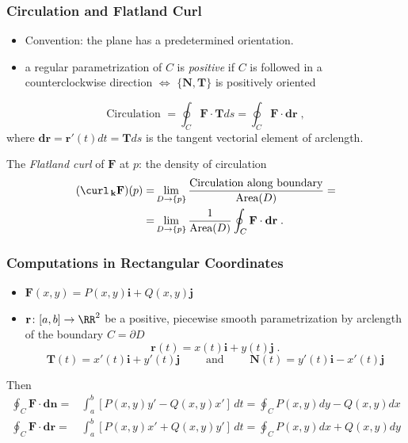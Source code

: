 \begin{frame}
  \frametitle{Circulation and Flatland Curl}

    \begin{itemize}
      \item Convention: the plane has a predetermined orientation.
      \item a regular parametrization of $C$ is \emph{positive} if $C$ is followed in a counterclockwise direction $\Longleftrightarrow$ $\{ \textbf{N}, \textbf{T}\}$ is positively oriented
    \end{itemize}

%
$$\text{Circulation } = \oint_C \textbf{F} \cdot \textbf{T} ds = \oint_C \textbf{F} \cdot \textbf{dr}\; ,$$
%
where $\textbf{dr} = \textbf{r}'(t) dt = \textbf{T} ds$ is the tangent vectorial element of arclength.

\medskip

\pause The \emph{Flatland curl} of $\textbf{F}$ at $p$:  the density of circulation
%
\begin{align*}
(\curl_{\,\textbf{k}} \textbf{F})(p)= & \lim_{D \to \{p\}} \frac{\text{Circulation along boundary}}{\text{Area}(D)} =  \\ = &
      \lim_{D\to \{p\}} \frac{1}{\text{Area}(D)} \oint_C \textbf{F} \cdot \textbf{dr} \; .
\end{align*}

\end{frame}

\begin{frame}
  \frametitle{Computations in Rectangular Coordinates}
\begin{itemize}
  \item $\textbf{F} (x,y) = P(x,y) \textbf{i} + Q(x,y) \textbf{j}$
  \item $\textbf{r} \colon [a,b] \to \RR^2$ be a positive, piecewise smooth parametrization by arclength of the boundary $C = \partial D$
%
$$\textbf{r}(t) = x(t) \textbf{i} + y(t) \textbf{j} \; .$$
%
$$
  \textbf{T} (t)  = x'(t) \textbf{i} + y'(t) \textbf{j} \qquad \text{ and } \qquad
  \textbf{N} (t)  = y'(t) \textbf{i} - x'(t) \textbf{j}
$$
%
\end{itemize}

Then
%
\begin{align*}
  \oint_C \textbf{F} \cdot \textbf{dn} = & \int_a^b \left[P(x,y) y' - Q(x,y) x'\right]\, dt  = \oint_C P(x,y) dy - Q(x,y) dx \\
%
  \oint_C \textbf{F} \cdot \textbf{dr} = & \int_a^b \left[P(x,y) x'+ Q(x,y) y'\right]\, dt  = \oint_C P(x,y) dx + Q(x,y) dy
\end{align*}

\end{frame}

